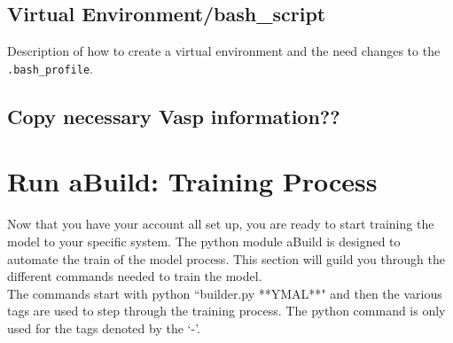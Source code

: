\documentclass{article}
\begin{document}
\subsection{Virtual Environment/bash\_script}
Description of how to create a virtual environment and the need
changes to the \verb|.bash_profile|.

\subsection{Copy necessary Vasp information??}

\section{Run aBuild: Training Process}                      
Now that you have your account all set up, you are ready to start
training the model to your specific system. The python module aBuild
is designed to automate the train of the model process. This section
will guild you through the different commands needed to train the model.\\

The commands start with python ``builder.py **YMAL**" and then the
various tags are used to step through the training process. The python
command is only used for the tags denoted by the `-'.
\end{document}
